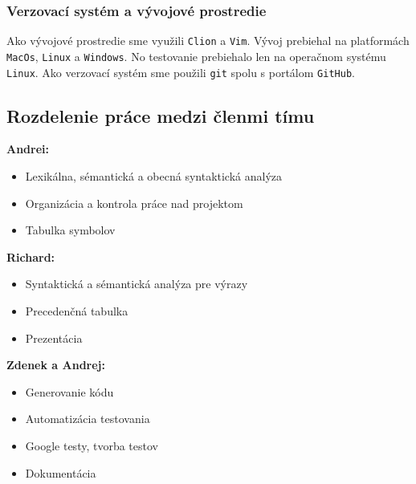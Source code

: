\documentclass[a4paper, 11pt]{article}
\begin{document}
    \subsubsection{Verzovací systém a vývojové prostredie}
    Ako vývojové prostredie sme využili \texttt{Clion} a \texttt{Vim}. Vývoj prebiehal na platformách \texttt{MacOs}, \texttt{Linux} a \texttt{Windows}. No
    testovanie prebiehalo len na operačnom systému \texttt{Linux}. Ako verzovací systém sme použili \texttt{git} spolu s portálom
    \texttt{GitHub}.

    \subsection{Rozdelenie práce medzi členmi tímu}
    \leavevmode\newline
    \textbf{Andrei:}
    \begin{itemize}
        \item  Lexikálna, sémantická a obecná syntaktická analýza
        \item  Organizácia a kontrola práce nad projektom
        \item  Tabulka symbolov
    \end{itemize}\leavevmode\newline
    \textbf{Richard:}
    \begin{itemize}
        \item  Syntaktická a sémantická analýza pre výrazy
        \item  Precedenčná tabulka
        \item  Prezentácia
    \end{itemize}\leavevmode\newline
    \textbf{Zdenek a Andrej:}
    \begin{itemize}
        \item  Generovanie kódu
        \item  Automatizácia testovania
        \item  Google testy, tvorba testov
        \item  Dokumentácia
    \end{itemize}


\end{document}
